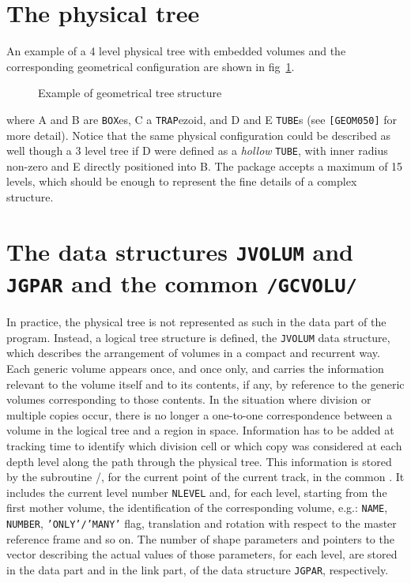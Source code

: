\section{The physical tree}
An example of a 4 level physical tree with embedded volumes and
the corresponding geometrical configuration are shown in fig~\ref{fg:geom001-1}.

\begin{figure}[hbt]
      \centering
      \caption{Example of geometrical tree structure}
      \label{fg:geom001-1}
\end{figure}

where A and B are {\tt BOX}es, C a {\tt TRAP}ezoid, and D and E {\tt TUBE}s
(see {\tt [GEOM050]} for more detail).
Notice that the same physical configuration could be described as well though
a 3 level tree if D were defined as a {\it hollow}
{\tt TUBE}, with inner radius non-zero and E
directly positioned into B.
The package accepts a maximum of 15 levels, which should be
enough to represent the fine details of a complex structure.
\section{The data structures {\tt JVOLUM} and {\tt JGPAR}
and the common {\tt /GCVOLU/}}

In practice, the physical tree is not represented as such in the
data part of the program. Instead, a logical tree structure is defined,
the {\tt JVOLUM} data structure, which describes the arrangement of
volumes in a compact and recurrent way. Each generic volume appears once,
and once only, and carries the information relevant to the volume itself
and to its contents, if any, by reference to the
generic volumes corresponding to those contents.
In the situation where division or multiple copies occur, there
is no longer a one-to-one correspondence between a volume in the
logical tree and a region in space. Information has to be added at
tracking time to identify which division cell or which copy was considered
at each depth level along the path through the physical tree. This
information is stored by the subroutine /, for the
current point of the current track, in the common . It includes
the current level number {\tt NLEVEL} and, for each level, starting from the
first mother volume, the identification of the corresponding volume, e.g.:
{\tt NAME}, {\tt NUMBER}, {\tt 'ONLY'/'MANY'} flag, translation and rotation
with respect to the master reference frame and so on. 
The number of shape parameters
and pointers to the vector describing the actual values of those
parameters, for each level, are stored in the data part and in the link
part, of the data structure {\tt JGPAR}, respectively.

